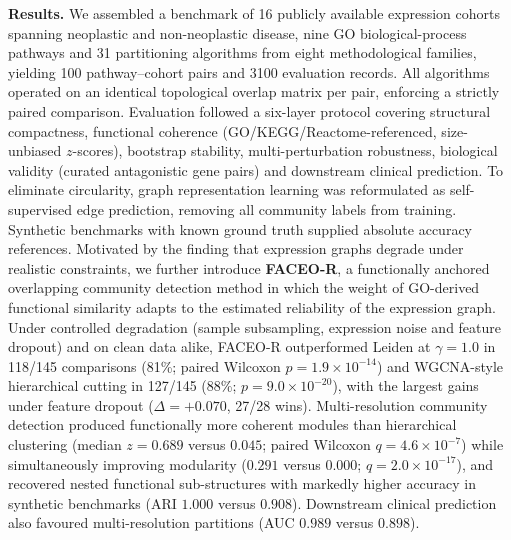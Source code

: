 \documentclass[twocolumn,10pt,a4paper]{article}
\begin{document}
{\begin{minipage}{0.955\textwidth}
\vspace{4pt}
\noindent\textbf{Results.} We assembled a benchmark of 16 publicly available expression
cohorts spanning neoplastic and non-neoplastic disease, nine GO biological-process
pathways and 31 partitioning algorithms from eight methodological families, yielding 100
pathway--cohort pairs and 3100 evaluation records. All algorithms operated on an identical
topological overlap matrix per pair, enforcing a strictly paired comparison. Evaluation
followed a six-layer protocol covering structural compactness, functional coherence
(GO/KEGG/Reactome-referenced, size-unbiased $z$-scores), bootstrap stability,
multi-perturbation robustness, biological validity (curated antagonistic gene pairs) and
downstream clinical prediction. To eliminate circularity, graph representation learning was
reformulated as self-supervised edge prediction, removing all community labels from
training. Synthetic benchmarks with known ground truth supplied absolute accuracy
references. Motivated by the finding that expression graphs degrade under realistic
constraints, we further introduce \textbf{FACEO-R}, a functionally anchored overlapping
community detection method in which the weight of GO-derived functional similarity adapts
to the estimated reliability of the expression graph. Under controlled degradation (sample
subsampling, expression noise and feature dropout) and on clean data alike, FACEO-R
outperformed Leiden at $\gamma = 1.0$ in 118/145 comparisons (81\%;
paired Wilcoxon $p = 1.9\times10^{-14}$) and WGCNA-style
hierarchical cutting in 127/145 (88\%; $p = 9.0\times10^{-20}$), with
the largest gains under feature dropout ($\Delta = +0.070$, 27/28 wins). Multi-resolution community detection produced functionally more coherent
modules than hierarchical clustering (median $z = 0.689$ versus $0.045$; paired Wilcoxon
$q = 4.6\times10^{-7}$) while simultaneously improving modularity
($0.291$ versus $0.000$; $q = 2.0\times10^{-17}$), and recovered nested functional
sub-structures with markedly higher accuracy in synthetic benchmarks (ARI $1.000$ versus
$0.908$). Downstream clinical prediction also favoured multi-resolution partitions
(AUC $0.989$ versus $0.898$).


\end{minipage}}
\end{document}
